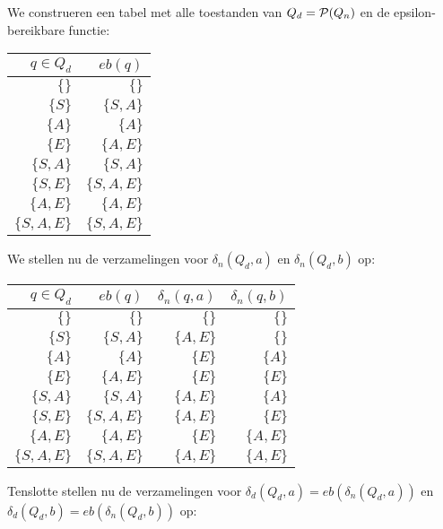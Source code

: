 We construeren een tabel met alle toestanden van $Q_d = \mathcal{P}(Q_n)$ en de epsilon-bereikbare functie:

\begin{center}
\begin{tabular}{r|r}
  $q \in Q_d$ & $eb(q)$ \\ \hline
  $\{\}$ & $\{\}$ \\
  $\{S\}$ & $\{S,A\}$ \\
  $\{A\}$ & $\{A\}$ \\
  $\{E\}$ & $\{A,E\}$ \\
  $\{S,A\}$ & $\{S,A\}$ \\
  $\{S,E\}$ & $\{S,A,E\}$ \\
  $\{A,E\}$ & $\{A,E\}$ \\
  $\{S,A,E\}$ & $\{S,A,E\}$ \\
\end{tabular}
\end{center}

We stellen nu de verzamelingen voor $\delta_n(Q_d,a)$ en $\delta_n(Q_d,b)$ op:

\begin{center}
\begin{tabular}{r|r|r|r}
  $q \in Q_d$ & $eb(q)$ & $\delta_n(q,a)$ & $\delta_n(q,b)$ \\ \hline
  $\{\}$ & $\{\}$ & $\{\}$ & $\{\}$ \\
  $\{S\}$ & $\{S,A\}$ & $\{A,E\}$ & $\{\}$ \\
  $\{A\}$ & $\{A\}$ & $\{E\}$ & $\{A\}$ \\
  $\{E\}$ & $\{A,E\}$ & $\{E\}$ & $\{E\}$ \\
  $\{S,A\}$ & $\{S,A\}$ & $\{A,E\}$ & $\{A\}$ \\
  $\{S,E\}$ & $\{S,A,E\}$ & $\{A,E\}$ & $\{E\}$ \\
  $\{A,E\}$ & $\{A,E\}$ & $\{E\}$ & $\{A,E\}$ \\
  $\{S,A,E\}$ & $\{S,A,E\}$ & $\{A,E\}$ & $\{A,E\}$ \\
\end{tabular}
\end{center}

Tenslotte stellen nu de verzamelingen voor $\delta_d(Q_d,a)=eb(\delta_n(Q_d,a))$ en $\delta_d(Q_d,b)=eb(\delta_n(Q_d,b))$ op:


